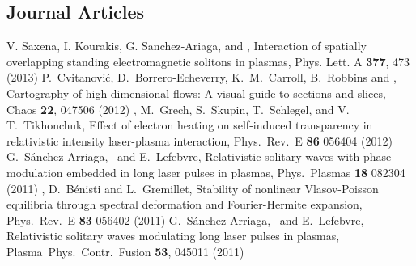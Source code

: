 \subsection{Journal Articles}
	{V. Saxena, I. Kourakis, G. Sanchez-Ariaga, and \siminos,
	{\emtitle Interaction of spatially overlapping standing electromagnetic solitons in plasmas},
	{\emjournal Phys. Lett. A} \textbf{377}, 473 (2013)
	}
	{P.~Cvitanovi{\'c}, D.~Borrero-Echeverry, K.~M.~Carroll, B.~Robbins and \siminos,
	{\emtitle Cartography of high-dimensional flows: A visual guide to sections and slices},
	{\emjournal Chaos} \textbf{22}, 047506 (2012) %
	}
	{\siminos, M.~Grech, S.~Skupin, T.~Schlegel, and V.\,T.~Tikhonchuk,
	{\emtitle Effect of electron heating on self-induced transparency in relativistic intensity laser-plasma interaction},
	{\emjournal Phys.~Rev.~E}  \textbf{86} 056404 (2012) %
	}
	{G.~S\'anchez-Arriaga, \siminos\ and E.~Lefebvre,
	{\emtitle Relativistic solitary waves with phase modulation embedded in long laser pulses in plasmas,}
	{\emjournal Phys.~Plasmas} \textbf{18} 082304 (2011) %
	}
	{\siminos, D.~B\'enisti and L.~Gremillet,
	{\emtitle Stability of nonlinear Vlasov-Poisson equilibria through spectral deformation and Fourier-Hermite expansion,}
	{\emjournal Phys.~Rev.~E} \textbf{83} 056402 (2011) %
	}
	{G.~S\'anchez-Arriaga, \siminos\ and E.~Lefebvre,
	{\emtitle Relativistic solitary waves modulating long laser pulses in plasmas,}
	{\emjournal Plasma~Phys.~Contr.~Fusion} \textbf{53}, 045011 (2011)%
	}
